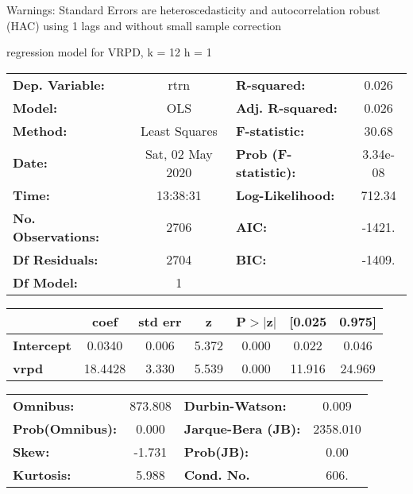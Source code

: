 Warnings: \newline
 [1] Standard Errors are heteroscedasticity and autocorrelation robust (HAC) using 1 lags and without small sample correction\ 

regression model for VRPD, k = 12 h = 1\begin{center}
\begin{tabular}{lclc}
\toprule
\textbf{Dep. Variable:}    &       rtrn       & \textbf{  R-squared:         } &     0.026   \\
\textbf{Model:}            &       OLS        & \textbf{  Adj. R-squared:    } &     0.026   \\
\textbf{Method:}           &  Least Squares   & \textbf{  F-statistic:       } &     30.68   \\
\textbf{Date:}             & Sat, 02 May 2020 & \textbf{  Prob (F-statistic):} &  3.34e-08   \\
\textbf{Time:}             &     13:38:31     & \textbf{  Log-Likelihood:    } &    712.34   \\
\textbf{No. Observations:} &        2706      & \textbf{  AIC:               } &    -1421.   \\
\textbf{Df Residuals:}     &        2704      & \textbf{  BIC:               } &    -1409.   \\
\textbf{Df Model:}         &           1      & \textbf{                     } &             \\
\bottomrule
\end{tabular}
\begin{tabular}{lcccccc}
                   & \textbf{coef} & \textbf{std err} & \textbf{z} & \textbf{P$> |$z$|$} & \textbf{[0.025} & \textbf{0.975]}  \\
\midrule
\textbf{Intercept} &       0.0340  &        0.006     &     5.372  &         0.000        &        0.022    &        0.046     \\
\textbf{vrpd}      &      18.4428  &        3.330     &     5.539  &         0.000        &       11.916    &       24.969     \\
\bottomrule
\end{tabular}
\begin{tabular}{lclc}
\textbf{Omnibus:}       & 873.808 & \textbf{  Durbin-Watson:     } &    0.009  \\
\textbf{Prob(Omnibus):} &   0.000 & \textbf{  Jarque-Bera (JB):  } & 2358.010  \\
\textbf{Skew:}          &  -1.731 & \textbf{  Prob(JB):          } &     0.00  \\
\textbf{Kurtosis:}      &   5.988 & \textbf{  Cond. No.          } &     606.  \\
\bottomrule
\end{tabular}
\end{center}

